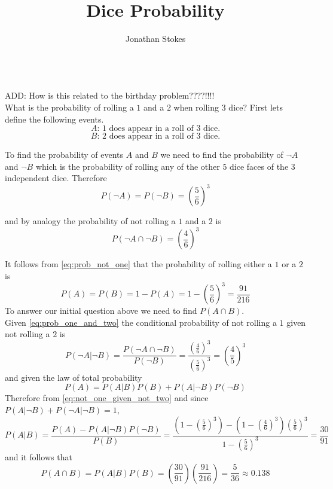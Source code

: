 \documentclass[12pt,a4paper]{article}
\title{Dice Probability}
\author{Jonathan Stokes}
\begin{document}
\maketitle

\hrulefill\\

ADD: How is this related to the birthday problem????!!!!\\

What is the probability of rolling a $1$ and a $2$ when rolling $3$ dice? First lets define the following events.
\begin{equation}
A \text{: 1 does appear in a roll of 3 dice.}
\end{equation}
\begin{equation}
B \text{: 2 does appear in a roll of 3 dice.}
\end{equation}

To find the probability of events $A$ and $B$ we need to find the probability of $\neg A$ and $\neg B$ which is the probability of rolling any of the other $5$ dice faces of the $3$ independent dice. Therefore
\begin{equation}
P(\neg A) = P(\neg B) = \left(\frac{5}{6}\right)^3
\label{eq:prob_not_one}
\end{equation}

and by analogy the probability of not rolling a $1$ and a $2$ is
\begin{equation}
P(\neg A \cap \neg B) = \left(\frac{4}{6}\right)^3
\label{eq:prob_one_and_two}
\end{equation}

It follows from \cref{eq:prob_not_one} that the probability of rolling either a $1$ or a $2$ is
\begin{equation}
P(A) = P(B) = 1-P(A) = 1 - \left(\frac{5}{6}\right)^3 = \frac{91}{216}
\end{equation}
To answer our initial question above we need to find $P(A \cap B)$.\\

Given \cref{eq:prob_one_and_two} the conditional probability of not rolling a $1$ given not rolling a $2$ is
\begin{equation}
P(\neg A| \neg B) = \frac{P(\neg A \cap \neg B)}{P(\neg B)} = \frac{\left(\frac{4}{6}\right)^3}{\left(\frac{5}{6}\right)^3} = \left(\frac{4}{5}\right)^3
\label{eq:not_one_given_not_two}
\end{equation}
and given the law of total probability
\begin{equation}
P(A) = P(A|B)P(B)+P(A|\neg B)P(\neg B)
\end{equation}
Therefore from \cref{eq:not_one_given_not_two} and since $P(A|\neg B) + P(\neg A|\neg B) = 1$,
\begin{equation}
P(A|B) = \frac{P(A) - P(A|\neg B)P(\neg B)}{P(B)} = \frac{\left(1-\left(\frac{5}{6}\right)^3\right) - \left(1-\left(\frac{4}{6}\right)^3\right)\left(\frac{5}{6}\right)^3}{1-\left(\frac{5}{6}\right)^3} = \frac{30}{91}
\end{equation}
and it follows that
\begin{equation}
P(A \cap B) = P(A|B)P(B) = \left(\frac{30}{91}\right) \left(\frac{91}{216}\right) = \frac{5}{36} \approx 0.138
\end{equation}
\end{document}
